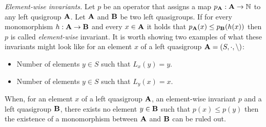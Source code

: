 \textit{Element-wise invariants.}\newline
Let $p$ be an operator that assigns a map $p_\mathbf{A} : \mathbf{A} \to \mathbb{N}$ to any left qusigroup $\mathbf{A}$.\newline
Let $\mathbf{A}$ and $\mathbf{B}$ be two left quasigroups. If for every monomorphism $h :\mathbf{A} \to \mathbf{B}$ and every $x \in \mathbf{A}$ it holds that $p_\mathbf{A}(x) \leq p_\mathbf{B}(h(x))$ then $p$ is called \emph{element-wise} invariant.\newline
It is worth showing two examples of what these invariants might look like for an element $x$ of a left quasigroup $\mathbf{A} = (S, \cdot, \backslash)$:
\begin{itemize}
    \item Number of elements $y \in S$ such that $L_x(y) = y$.
    \item Number of elements $y \in S$ such that $L_y(x) = x$.
\end{itemize}
When, for an element $x$ of a left quasigroup $\mathbf{A}$, an element-wise invariant $p$ and a left quasigroup $\mathbf{B}$, there exists no element $y\in\mathbf{B}$ such that $p(x)\leq p(y)$ then the existence of a monomorphism between $\mathbf{A}$ and $\mathbf{B}$ can be ruled out.